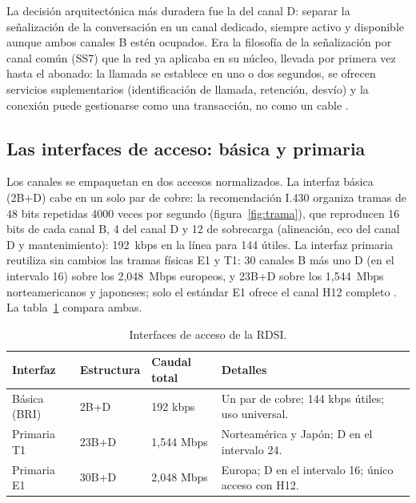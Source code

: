 \documentclass[12pt,a4paper]{article}
\begin{document}
La decisión arquitectónica más duradera fue la del canal D: separar la señalización de la conversación en un canal dedicado, siempre activo y disponible aunque ambos canales B estén ocupados. Era la filosofía de la señalización por canal común (SS7) que la red ya aplicaba en su núcleo, llevada por primera vez hasta el abonado: la llamada se establece en uno o dos segundos, se ofrecen servicios suplementarios (identificación de llamada, retención, desvío) y la conexión puede gestionarse como una transacción, no como un cable \cite{stallings1999, ituq931}.

\subsection{Las interfaces de acceso: básica y primaria}

Los canales se empaquetan en dos accesos normalizados. La interfaz básica (2B+D) cabe en un solo par de cobre: la recomendación I.430 organiza tramas de 48 bits repetidas 4000 veces por segundo (figura~\ref{fig:trama}), que reproducen 16 bits de cada canal B, 4 del canal D y 12 de sobrecarga (alineación, eco del canal D y mantenimiento): 192~kbps en la línea para 144 útiles. La interfaz primaria reutiliza sin cambios las tramas físicas E1 y T1: 30 canales B más uno D (en el intervalo 16) sobre los 2,048~Mbps europeos, y 23B+D sobre los 1,544~Mbps norteamericanos y japoneses; solo el estándar E1 ofrece el canal H12 completo \cite{itui431, ituq921}. La tabla~\ref{tab:interfaces} compara ambas.

\begin{table}[h]
    \centering
    \small
    \begin{tabularx}{\textwidth}{l l l X}
        \toprule
        \textbf{Interfaz} & \textbf{Estructura} & \textbf{Caudal total} & \textbf{Detalles} \\
        \midrule
        Básica (BRI)   & 2B+D   & 192 kbps   & Un par de cobre; 144 kbps útiles; uso universal. \\
        Primaria T1    & 23B+D  & 1,544 Mbps & Norteamérica y Japón; D en el intervalo 24. \\
        Primaria E1    & 30B+D  & 2,048 Mbps & Europa; D en el intervalo 16; único acceso con H12. \\
        \bottomrule
    \end{tabularx}
    \caption{Interfaces de acceso de la RDSI.}
    \label{tab:interfaces}
\end{table}
\end{document}
